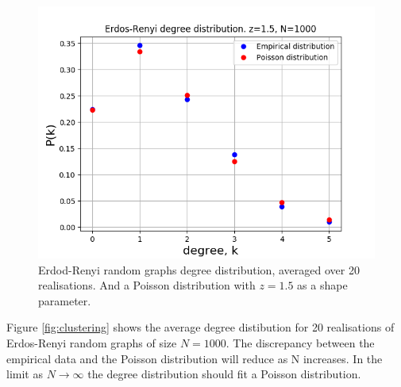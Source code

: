 \documentclass{article}
\begin{document}
\begin{figure}[H]
\includegraphics[scale=0.8]{poisson_a.png} 
\caption{Erdod-Renyi random graphs degree distribution, averaged over 20 realisations. And a Poisson distribution with $z=1.5$ as a shape parameter.} 
\label{fig:poisson}
\end{figure}

Figure \ref{fig:clustering} shows the average degree distibution for 20 realisations of Erdos-Renyi random graphs of size $N=1000$. The discrepancy between the empirical data and the Poisson distribution will reduce as N increases. In the limit as $N \to \infty$ the degree distribution should fit a Poisson distribution. 
\end{document}
